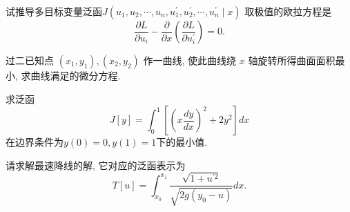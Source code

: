 \documentclass[11pt]{article}
\begin{document}

  

\vspace{0.5cm}

\begin{hwproblem}{}
  试推导多目标变量泛函$J\left(u_1, u_2, \cdots, u_n, u_1^{\prime}, u_2^{\prime}, \cdots, u_n^{\prime} \mid x\right)$
  取极值的欧拉方程是
  $$
  \frac{\partial L}{\partial u_i}-\frac{\partial}{\partial x}\left(\frac{\partial L}{\partial u_i^{\prime}}\right)=0 .
  $$
  \end{hwproblem}

\vspace{0.5cm}
  
  
\begin{hwproblem}{}
  过二已知点 $\left(x_1, y_1\right),\left(x_2, y_2\right)$ 作一曲线, 使此曲线绕 $x$ 轴旋转所得曲面面积最小, 求曲线满足的微分方程.
\end{hwproblem}

\vspace{0.5cm}
    

\begin{hwproblem}{}
求泛函
$$
J[y] = \int_0^1 \left[ \left(x \frac{dy}{dx} \right)^2 + 2 y^2 \right] dx
$$
在边界条件为$y(0) = 0, y(1) = 1$下的最小值.
\end{hwproblem}

\vspace{0.5cm}

\begin{hwproblem}{}
  请求解最速降线的解, 它对应的泛函表示为
  $$
  T[u] = \int_{x_0}^{x_1} \frac{\sqrt{1+u^{\prime 2}}}{\sqrt{2 g\left(y_0-u\right)}} d x .
  $$
\end{hwproblem}

\vspace{0.5cm}



\hwrequirements
\end{document}
